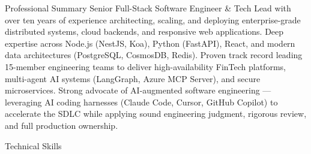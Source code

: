 \documentclass{resume}
\begin{document}
  \makecvheader

  \begin{rSection}{Professional Summary}
    Senior Full-Stack Software Engineer \& Tech Lead with over ten years of experience architecting, scaling, and deploying enterprise-grade distributed systems, cloud backends, and responsive web applications. Deep expertise across Node.js (NestJS, Koa), Python (FastAPI), React, and modern data architectures (PostgreSQL, CosmosDB, Redis). Proven track record leading 15-member engineering teams to deliver high-availability FinTech platforms, multi-agent AI systems (LangGraph, Azure MCP Server), and secure microservices. Strong advocate of AI-augmented software engineering --- leveraging AI coding harnesses (Claude Code, Cursor, GitHub Copilot) to accelerate the SDLC while applying sound engineering judgment, rigorous review, and full production ownership.
  \end{rSection}

  \begin{rSection}{Technical Skills}
  \end{rSection}
  
\end{document}
